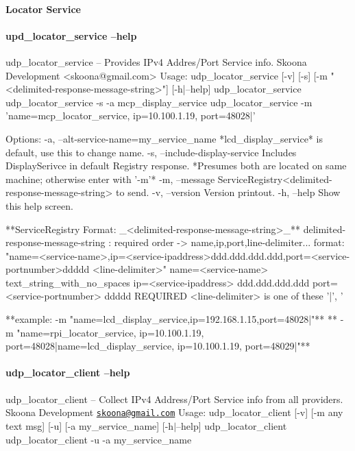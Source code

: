 \paragraph*{Locator Service}



\paragraph*{upd\+\_\+locator\+\_\+service --help}

\begin{DoxyVerb}udp_locator_service -- Provides IPv4 Addres/Port Service info.
          Skoona Development <skoona@gmail.com>
Usage:
  udp_locator_service [-v] [-s] [-m "<delimited-response-message-string>"] [-h|--help]
  udp_locator_service 
  udp_locator_service -s -a mcp_display_service
  udp_locator_service -m 'name=mcp_locator_service, ip=10.100.1.19, port=48028|'

Options:
  -a, --alt-service-name=my_service_name
                 *lcd_display_service* is default, use this to change name.
  -s, --include-display-service  Includes DisplaySerivce in default Registry response.
                *Presumes both are located on same machine; otherwise enter with '-m'*
  -m, --message  ServiceRegistry<delimited-response-message-string> to send.
  -v, --version  Version printout.
  -h, --help     Show this help screen.

  **ServiceRegistry Format:  _<delimited-response-message-string>_**
    delimited-response-message-string : required order -> name,ip,port,line-delimiter...
      format: "name=<service-name>,ip=<service-ipaddress>ddd.ddd.ddd.ddd,port=<service-portnumber>ddddd <line-delimiter>"
        name=<service-name> text_string_with_no_spaces
        ip=<service-ipaddress> ddd.ddd.ddd.ddd
        port=<service-portnumber> ddddd
      REQUIRED   <line-delimiter> is one of these '|', '%

    **example: -m "name=lcd_display_service,ip=192.168.1.15,port=48028|"**
    ** -m "name=rpi_locator_service, ip=10.100.1.19, port=48028|name=lcd_display_service, ip=10.100.1.19, port=48029|"**
\end{DoxyVerb}


\paragraph*{udp\+\_\+locator\+\_\+client --help}

udp\+\_\+locator\+\_\+client -- Collect I\+Pv4 Address/\+Port Service info from all providers. Skoona Development \href{mailto:skoona@gmail.com}{\tt skoona@gmail.\+com} Usage\+: udp\+\_\+locator\+\_\+client \mbox{[}-\/v\mbox{]} \mbox{[}-\/m \textquotesingle{}any text msg\textquotesingle{}\mbox{]} \mbox{[}-\/u\mbox{]} \mbox{[}-\/a \textquotesingle{}my\+\_\+service\+\_\+name\textquotesingle{}\mbox{]} \mbox{[}-\/h$\vert$--help\mbox{]} udp\+\_\+locator\+\_\+client udp\+\_\+locator\+\_\+client -\/u -\/a \textquotesingle{}my\+\_\+service\+\_\+name\textquotesingle{}

